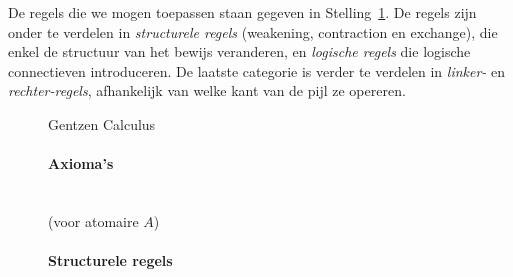 De regels die we mogen toepassen staan gegeven in Stelling~\ref{th:lk}. De regels zijn onder te verdelen in \emph{structurele regels} (weakening, contraction en exchange), die enkel de structuur van het bewijs veranderen, en \emph{logische regels} die logische connectieven introduceren. De laatste categorie is verder te verdelen in \emph{linker-} en \emph{rechter-regels}, afhankelijk van welke kant van de pijl ze opereren.

\begin{figure}[ht]
\begin{theorem}\label{th:lk} Gentzen Calculus \lk
\paragraph{Axioma's}\mbox{}\\[3mm]
 (voor atomaire $A$)
\hspace{5mm}
\hspace{5mm}

\paragraph{Structurele regels}\mbox{}\\[3mm]
\hspace{5mm}

\vspace{5mm}

\hspace{5mm}

\vspace{5mm}

\hspace{5mm}

\vspace{5mm}



\end{theorem}
\end{figure}
